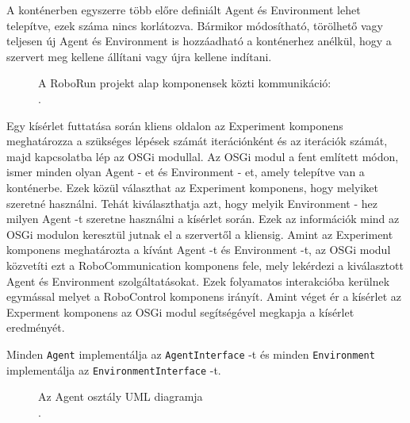 	 A konténerben egyszerre több előre definiált Agent és Environment lehet telepítve, ezek száma nincs korlátozva. Bármikor módosítható, törölhető vagy teljesen új Agent és Environment is hozzáadható a konténerhez anélkül, hogy a szervert meg kellene állítani vagy újra kellene indítani.

\begin{figure}[t]
  \centering
  \caption[RoboRun alap komponensek]%
  {A RoboRun projekt alap komponensek közti kommunikáció:\\
  {\white .}\hfill\url{}}
  \label{fig:ALAP:sm1}
\end{figure}

Egy kísérlet futtatása során kliens oldalon az Experiment komponens meghatározza a szükséges lépések számát iterációnként és az iterációk számát, majd kapcsolatba lép az OSGi modullal. Az OSGi modul a fent említett módon, ismer minden olyan Agent - et és Environment - et, amely telepítve van a konténerbe. Ezek közül választhat az Experiment komponens, hogy melyiket szeretné használni. Tehát kiválaszthatja azt, hogy melyik Environment - hez milyen Agent -t szeretne használni a kísérlet során. Ezek az információk mind az OSGi modulon keresztül jutnak el a szervertől a kliensig. Amint az Experiment komponens meghatározta a kívánt Agent -t és Environment -t, az OSGi modul közvetíti ezt a RoboCommunication komponens fele, mely lekérdezi a kiválasztott Agent és Environment szolgáltatásokat. Ezek folyamatos interakcióba kerülnek egymással melyet a RoboControl komponens irányít. Amint véget ér a kísérlet az Experment komponens az OSGi modul segítségével megkapja a kísérlet eredményét.

	Minden \texttt{Agent} implementálja az \texttt{AgentInterface} -t és minden \texttt{Environment} implementálja az \texttt{EnvironmentInterface} -t. 

\begin{figure}[t]
  \centering
  \caption[Példa képek beszúrására]%
  {Az Agent osztály UML diagramja\\
  {\white .}\hfill\url{}}
  \label{fig:ALAP:sm1}
\end{figure}



